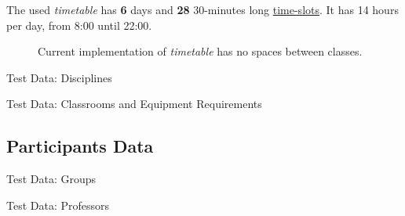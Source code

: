 \documentclass[../header]{subfiles}
\begin{document}
The used \emph{timetable} has \textbf{6} days and \textbf{28} 30-minutes long
\underline{time-slots}. It has 14 hours per day, from 8:00 until 22:00.

\begin{figure}[h]
  \centering
  
  \caption[Current timetables implementation]
          {Current implementation of \emph{timetable} has
           no spaces between classes. }
  \label{fig:timetable-current}
\end{figure}




\begin{table}[H]\caption{Test Data: Disciplines}
\label{data:disciplines}
  \centering
  
\end{table}



\begin{table}[H]\caption{Test Data: Classrooms and Equipment Requirements}
\label{data:classrooms}
  \centering
  
  \hfill
  
\end{table}


\subsection{Participants Data}

\begin{table}[H]\caption{Test Data: Groups}
\label{data:groups}
  \centering
  
\end{table}

\begin{table}[H]\ContinuedFloat
  \centering
  
\end{table}



\begin{table}[H]\caption{Test Data: Professors}
\label{data:professors}
  \centering
  
\end{table}


\begin{table}[H]\ContinuedFloat
  \centering
  
\end{table}
\end{document}

